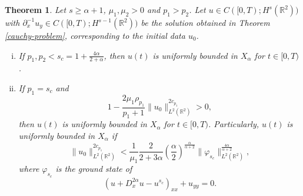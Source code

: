 \documentclass[10pt]{article}
\numberwithin{equation}{section}
\newtheorem{theorem}{\quad Theorem}[section]
\newcommand{\lt}{{L^2(\mathbb{R}^2)}}
\newcommand{\ff}{\varphi}
\newcommand{\x}{{X_\alpha}}
\newcommand{\nd}{{\partial_x^{-1}}}
\newcommand{\mo}{\mu_1}  \newcommand{\po}{{p_1}}
\newcommand{\moo}{\mu_2}  \newcommand{\poo}{{p_2}}
\newcommand{\al}{\alpha}
\newcommand{\rt}{{\mathbb{R}^2}}
\begin{document}
	
	\begin{theorem}\label{subcritical-th}
		Let $s\geq\al+1$, $\mo,\moo>0$ and $\po>\poo$. Let $u\in C([0,T);H^s(\rt))$ with $\nd u_y\in C([0,T);H^{s-1}(\rt))$ be the solution obtained in Theorem \ref{cauchy-problem}, corresponding to the initial data $u_0$.
		\begin{enumerate}[(i)]
			\item If $\po,\poo<s_c =1+\frac{4\al}{2+\al}$, then $u(t)$ is uniformly bounded in $\x$ 	for $t\in [0, T )$.
			\item If $p_1=s_c$  and 
			\begin{equation}\label{crit-in}
				1-\frac{2\mu_1\rho_{p_1}}{\po+1}\|u_0\|_\lt^{2c_{p_1}}>0,
			\end{equation}
			then $u(t)$ is uniformly bounded in $\x$  	for $t\in [0, T )$. Particularly,  $u(t)$ is uniformly bounded in $\x$ if
			\[
			\|u_0\|_\lt^{2c_{p_1}}<\frac{1}{ \mu_1}
			\frac{2}{2+3\al}  \left(\frac{\al}{2}\right)^{\frac{\al}{\al+2}}\|\ff_{s_c}\|_\lt^{\frac{4\al}{\al+2}},
			\]
			where $\ff_{s_c}$ is the  ground state of
			\begin{equation}\label{criti-gs}
				\left(u+D_x^{2\al} u-u^{s_c} \right)_{xx}  + u_{yy}=0. 
			\end{equation}
		\end{enumerate} 
	\end{theorem}
	
\end{document}
